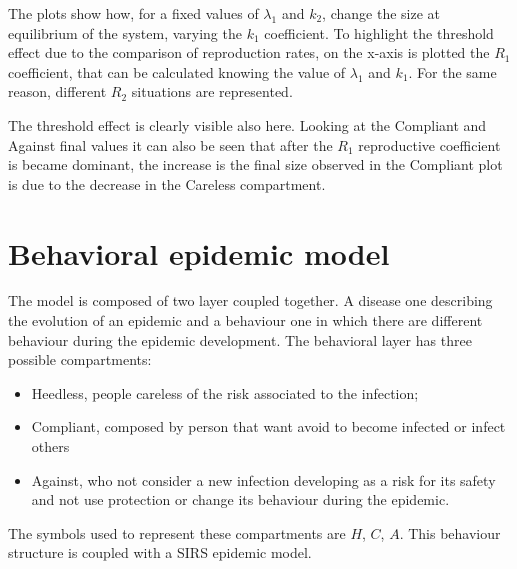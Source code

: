 The plots show how, for a fixed values of $\lambda_1$ and $k_2$, change the size at equilibrium of the system, varying the $k_1$ coefficient. To highlight the threshold effect due to the comparison of reproduction rates, on the x-axis is plotted the $R_1$  coefficient, that can be calculated knowing the value of  $\lambda_1$ and $k_1$. For the same reason, different $R_2$ situations are represented. 

The threshold effect is clearly visible also here. Looking at the Compliant and Against final values it can also be seen that after the $R_1$ reproductive coefficient is became dominant, the  increase is the final size observed in the Compliant plot is due to the decrease in the Careless compartment. 





\section{Behavioral epidemic model}
The model is composed of two layer coupled together. A disease one describing the evolution of an epidemic and a behaviour one in which there are different behaviour during the epidemic development.
The behavioral layer has three possible compartments: 

\begin{itemize}
	\item Heedless, people careless of the risk associated to the infection;
	\item Compliant, composed by person that want avoid to become infected or infect others
	\item Against, who not consider a new infection developing as a risk for its safety and not use protection or change its behaviour during the epidemic. 
\end{itemize}
The symbols used to represent these compartments are $H$, $C$, $A$.
This behaviour structure is coupled with a SIRS epidemic model.

